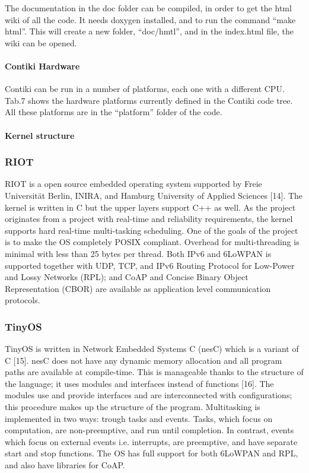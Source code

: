 The documentation in the doc folder can be compiled,
	in order to get the html wiki of all the code.
It needs doxygen installed,
	and to run the command “make html”.
This will create a new folder,
	“doc/hmtl”,
	and in the index.html file,
	the wiki can be opened.


\paragraph*{Contiki Hardware}
Contiki can be run in a number of platforms,
	each one with a different CPU.
Tab.7 shows the hardware platforms currently defined in the Contiki code tree.
All these platforms are in the “platform” folder of the code.

\paragraph*{Kernel structure}



\subsubsection{RIOT}

RIOT is a open source embedded operating system supported by Freie Universität Berlin,
	INIRA,
	and Hamburg University of Applied Sciences [14].
The kernel is written in C but the upper layers support C++ as well.
As the project originates from a project with real-time and reliability requirements,
	the kernel supports hard real-time multi-tasking scheduling.
One of the goals of the project is to make the OS completely POSIX compliant.
Overhead for multi-threading is minimal with less than 25 bytes per thread.
Both IPv6 and 6LoWPAN is supported together with UDP,
	TCP,
	and IPv6 Routing Protocol for Low-Power and Lossy Networks (RPL);
	and CoAP and Concise Binary Object Representation (CBOR) are available as application level communication protocols.

\subsubsection{TinyOS}

TinyOS is written in Network Embedded Systems C (nesC) which is a variant of C [15].
nesC does not have any dynamic memory allocation and all program paths are available at compile-time.
This is manageable thanks to the structure of the language;
	it uses modules and interfaces instead of functions [16].
The modules use and provide interfaces and are interconnected with configurations;
	this procedure makes up the structure of the program.
Multitasking is implemented in two ways:
	trough tasks and events.
Tasks,
	which focus on computation,
	are non-preemptive,
	and run until completion.
In contrast,
	events which focus on external events i.e.
interrupts,
	are preemptive,
	and have separate start and stop functions.
The OS has full support for both 6LoWPAN and RPL,
	and also have libraries for CoAP.


